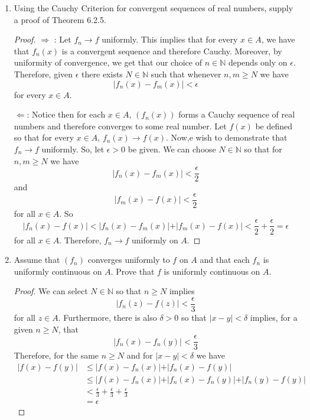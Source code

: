 \begin{enumerate}
    \item Using the Cauchy Criterion for convergent sequences of real numbers, supply a proof of Theorem 6.2.5.
    
    \begin{proof}
    
    \( \Rightarrow \) : Let \( f_n \rightarrow f \) uniformly. This implies that for every \( x \in A \), we have that \( f_n(x) \) is a convergent sequence and therefore Cauchy. Moreover, by uniformity of convergence, we get that our choice of \( n \in \mathbb{N} \) depends only on \( \epsilon \). Therefore, given \( \epsilon \) there exists \( N \in \mathbb{N} \) such that whenever \( n,m \geq N \) we have
    \[
    \vert f_n(x) - f_m(x) \vert < \epsilon
    \]
    for every \( x \in A \).
    
    \(\Leftarrow \): Notice then for each \( x \in A \), \( (f_n(x)) \) forms a Cauchy sequence of real numbers and therefore converges to some real number. Let \( f(x) \) be defined so that for every \( x \in A \), \( f_n(x) \rightarrow f(x) \). Now,e wish to demonstrate that \( f_n \rightarrow f \) uniformly. So, let \( \epsilon > 0 \) be given. We can choose \( N \in \mathbb{N} \) so that for \( n,m \geq N \) we have
    \[
    \vert f_n(x) - f_m(x) \vert < \frac{\epsilon}{2}
    \]
    and
    \[
    \vert f_m(x) - f(x) \vert < \frac{\epsilon}{2}
    \]
    for all \( x \in A \). So
    \[
    \vert f_n(x) - f(x) \vert < \vert f_n(x) - f_m(x) \vert + \vert f_m(x) - f(x) \vert < \frac{\epsilon}{2} + \frac{\epsilon}{2} = \epsilon
    \]
    for all \( x \in A \). Therefore, \( f_n \rightarrow f \) uniformly on \( A \). 
    \end{proof}
    
    \item Assume that \( (f_n) \) converges uniformly to \( f \) on \( A \) and that each \( f_n \) is uniformly continuous on \( A \). Prove that \( f \) is uniformly continuous on \( A \).
    \begin{proof}
    We can select \( N \in \mathbb{N} \) so that \( n \geq N \) implies
    \[
    \vert f_n(z) - f(z) \vert < \frac{\epsilon}{3}
    \]
    for all \( z \in A \). Furthermore, there is also \( \delta > 0 \) so that \( \vert x - y \vert < \delta \) implies, for a given \( n \geq N \), that
    \[
    \vert f_n(x) - f_n(y) \vert < \frac{\epsilon}{3}
    \]
    Therefore, for the same \( n \geq N \) and for \( \vert x - y \vert < \delta \) we have
    \begin{align*}
    \vert f(x) - f(y) \vert &\leq \vert f(x) - f_n(x) \vert + \vert f_n(x) - f(y) \vert \\
    &\leq \vert f(x) - f_n(x) \vert +  \vert f_n(x) - f_n(y) \vert + \vert f_n(y)-f(y) \vert \\
    &< \frac{\epsilon}{3} + \frac{\epsilon}{3} + \frac{\epsilon}{3} \\
    &= \epsilon
    \end{align*}
    \end{proof}
    

\end{enumerate}
